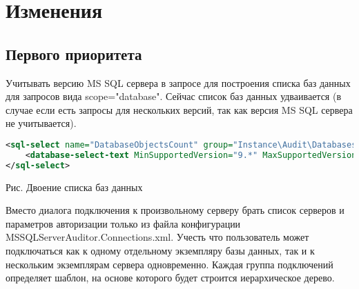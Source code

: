 \documentclass[10pt,a4paper]{article}
\begin{document}
\section{Изменения}

\subsection{Первого приоритета}

Учитывать версию MS SQL сервера в запросе для построения списка баз данных для
запросов вида scope="database". Сейчас список баз данных удваивается (в случае
если есть запросы для нескольких версий, так как версия MS SQL сервера не
учитывается).

\begin{lstlisting}[language=XML,label=MSSQLServerAuditor.Query.xml,caption=MSSQLServerAuditor.Query.xml]
<sql-select name="DatabaseObjectsCount" group="Instance\Audit\Databases\Objects" scope="database">
	<database-select-text MinSupportedVersion="9.*" MaxSupportedVersion="*" signature="">
</sql-select>
\end{lstlisting}

Рис. Двоение списка баз данных

Вместо диалога подключения к произвольному серверу брать список серверов и
параметров авторизации только из файла конфигурации
MSSQLServerAuditor.Connections.xml. Учесть что пользователь может подключаться
как к одному отдельному экземпляру базы данных, так и к нескольким экземплярам
сервера одновременно. Каждая группа подключений определяет шаблон, на основе
которого будет строится иерархическое дерево.
\end{document}
